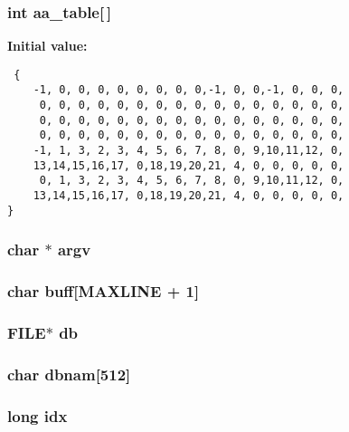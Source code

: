 \subsubsection{\setlength{\rightskip}{0pt plus 5cm}int aa\_\-table[$\,$]}\label{mpq_8c_a15}


{\bf Initial value:}

\footnotesize\begin{verbatim} {
    -1, 0, 0, 0, 0, 0, 0, 0, 0,-1, 0, 0,-1, 0, 0, 0,
     0, 0, 0, 0, 0, 0, 0, 0, 0, 0, 0, 0, 0, 0, 0, 0,
     0, 0, 0, 0, 0, 0, 0, 0, 0, 0, 0, 0, 0, 0, 0, 0,
     0, 0, 0, 0, 0, 0, 0, 0, 0, 0, 0, 0, 0, 0, 0, 0,
    -1, 1, 3, 2, 3, 4, 5, 6, 7, 8, 0, 9,10,11,12, 0,
    13,14,15,16,17, 0,18,19,20,21, 4, 0, 0, 0, 0, 0,
     0, 1, 3, 2, 3, 4, 5, 6, 7, 8, 0, 9,10,11,12, 0,
    13,14,15,16,17, 0,18,19,20,21, 4, 0, 0, 0, 0, 0,
}\end{verbatim}\normalsize 
{}
\subsubsection{\setlength{\rightskip}{0pt plus 5cm}char $\ast$ argv}\label{mpq_8c_a16}


\subsubsection{\setlength{\rightskip}{0pt plus 5cm}char buff[MAXLINE + 1]}\label{mpq_8c_a7}


\subsubsection{\setlength{\rightskip}{0pt plus 5cm}FILE$\ast$ db}\label{mpq_8c_a12}


\subsubsection{\setlength{\rightskip}{0pt plus 5cm}char dbnam[512]}\label{mpq_8c_a10}


\subsubsection{\setlength{\rightskip}{0pt plus 5cm}long idx}\label{mpq_8c_a9}


